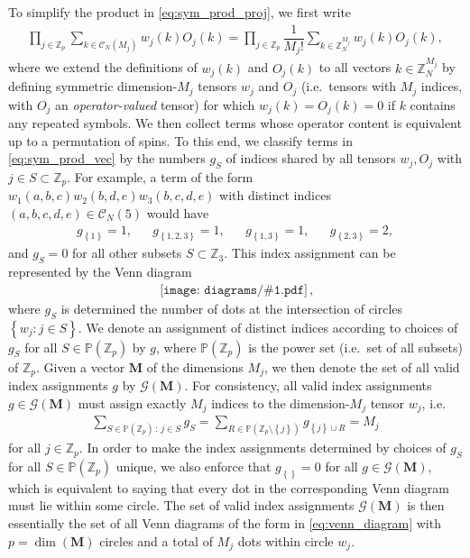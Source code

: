 \documentclass[nofootinbib,notitlepage,11pt]{revtex4-2}
\newcommand{\f}[2]{\dfrac{#1}{#2}} %
\newcommand{\p}[1]{\left(#1\right)} %
\renewcommand{\set}[1]{\left\{#1\right\}} %
\newcommand{\m}{\bm} %
\newcommand{\1}{\mathds{1}}
\newcommand{\C}{\mathcal{C}}
\newcommand{\G}{\mathcal{G}}
\newcommand{\PP}{\mathbb{P}}
\newcommand{\ZZ}{\mathbb{Z}}
\newcommand{\diagram}[1]
{\,\texttt{[image: diagrams/\#1.pdf]}\,}
\begin{document}
To simplify the product in \eqref{eq:sym_prod_proj}, we first write
\begin{align}
  \prod_{j\in\ZZ_p} \sum_{k\in\C_N\p{M_j}} w_j\p{k} O_j\p{k}
  = \prod_{j\in\ZZ_p} \f1{M_j!} \sum_{k\in\ZZ_N^{M_j}}
  w_j\p{k} O_j\p{k},
  \label{eq:sym_prod_vec}
\end{align}
where we extend the definitions of $w_j\p{k}$ and $O_j\p{k}$ to all
vectors $k\in\ZZ_N^{M_j}$ by defining symmetric dimension-$M_j$
tensors $w_j$ and $O_j$ (i.e.~tensors with $M_j$ indices, with $O_j$
an {\it operator-valued} tensor) for which $w_j\p{k}=O_j\p{k}=0$ if
$k$ contains any repeated symbols.  We then collect terms whose
operator content is equivalent up to a permutation of spins.  To this
end, we classify terms in \eqref{eq:sym_prod_vec} by the numbers $g_S$
of indices shared by all tensors $w_j,O_j$ with $j\in S\subset\ZZ_p$.
For example, a term of the form
$w_1\p{a,b,c} w_2\p{b,d,e} w_3\p{b,c,d,e}$ with distinct indices
$\p{a,b,c,d,e}\in\C_N\p{5}$ would have
\begin{align}
  g_{\set{1}} = 1,
  &&
  g_{\set{1,2,3}} = 1,
  &&
  g_{\set{1,3}} = 1,
  &&
  g_{\set{2,3}} = 2,
\end{align}
and $g_S=0$ for all other subsets $S\subset\ZZ_3$.  This index
assignment can be represented by the Venn diagram
\begin{align}
  \diagram{example_123},
  \label{eq:venn_diagram}
\end{align}
where $g_S$ is determined the number of dots at the intersection of
circles $\set{w_j:j\in S}$.  We denote an assignment of distinct
indices according to choices of $g_S$ for all $S\in\PP\p{\ZZ_p}$ by
$g$, where $\PP\p{\ZZ_p}$ is the power set (i.e.~set of all subsets)
of $\ZZ_p$.  Given a vector $\m M$ of the dimensions $M_j$, we then
denote the set of all valid index assignments $g$ by $\G\p{\m M}$.
For consistency, all valid index assignments $g\in\G\p{\m M}$ must
assign exactly $M_j$ indices to the dimension-$M_j$ tensor $w_j$,
i.e.~
\begin{align}
  \sum_{S\in\PP\p{\ZZ_p}\,:\,j\in S} g_S
  = \sum_{R\in\PP\p{\ZZ_p\setminus\set{j}}} g_{\set{j}\cup R}
  = M_j
\end{align}
for all $j\in\ZZ_p$.  In order to make the index assignments
determined by choices of $g_S$ for all $S\in\PP\p{\ZZ_p}$ unique, we
also enforce that $g_{\set{}}=0$ for all $g\in\G\p{\m M}$, which is
equivalent to saying that every dot in the corresponding Venn diagram
must lie within some circle.  The set of valid index assignments
$\G\p{\m M}$ is then essentially the set of all Venn diagrams of the
form in \eqref{eq:venn_diagram} with $p=\dim\p{\m M}$ circles and a
total of $M_j$ dots within circle $w_j$.
\end{document}
